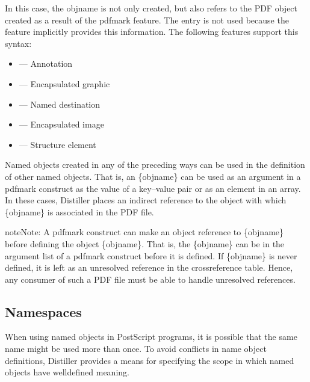 \documentclass[letterpaper,12pt,english,openany,oneside]{sphinxmanual}
\begin{document}
In this case, the objname is not only created, but also refers to the PDF object created as a result of the pdfmark feature. The  entry is not used because the feature implicitly provides this information. The following features support this syntax:
\begin{itemize}
\item {} 
 — Annotation

\item {} 
 — Encapsulated graphic

\item {} 
 — Named destination

\item {} 
 — Encapsulated image

\item {} 
 — Structure element

\end{itemize}

Named objects created in any of the preceding ways can be used in the definition of other named objects. That is, an \{objname\} can be used as an argument in a pdfmark construct as the value of a key–value pair or as an element in an array. In these cases, Distiller places an indirect reference to the object with which \{objname\} is associated in the PDF file.

\begin{sphinxadmonition}{note}{Note:}
A pdfmark construct can make an object reference to \{objname\} before defining the object \{objname\}. That is, the \{objname\} can be in the argument list of a pdfmark construct before it is defined. If \{objname\} is never defined, it is left as an unresolved reference in the cross\sphinxhyphen{}reference table. Hence, any consumer of such a PDF file must be able to handle unresolved references.
\end{sphinxadmonition}


\subsection{Namespaces}
\label{\detokenize{pdfmark_Syntax:namespaces}}
When using named objects in PostScript programs, it is possible that the same name might be used more than once. To avoid conflicts in name object definitions, Distiller provides a means for specifying the scope in which named objects have well\sphinxhyphen{}defined meaning.
\end{document}

